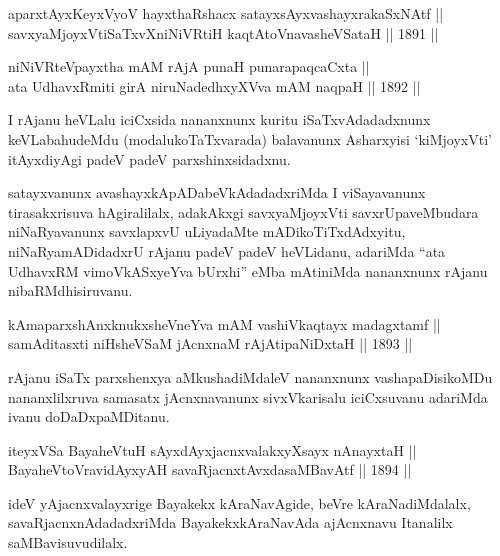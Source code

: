 \begin{shl}
aparxtAyxKeyxVyoV hayxthaRshacx satayxsAyxvashayxrakaSxNAtf || \\
savxyaMjoyxVtiSaTxvXniNiVRtiH kaqtA\s toV\s navasheVSataH \hfill || 1891 ||
  
\end{shl}

\begin{shl}
niNiVRteV\s payxtha mAM rAjA punaH punarapaqcaCxta || \\
ata UdhavxRmiti girA niruNadedhxyXVva mAM naqpaH \hfill || 1892 ||
  
\end{shl}

\begin{artha}
I rAjanu heVLalu iciCxsida nananxnunx kuritu iSaTxvAdadadxnunx
keVLabahudeMdu (modalukoTaTxvarada) balavanunx Asharxyisi `kiMjoyxVti'
itAyxdiyAgi padeV padeV parxshinxsidadxnu.
\end{artha}

\begin{artha}
satayxvanunx avashayxkApADabeVkAdadadxriMda I viSayavanunx
tirasakxrisuva hAgiralilalx, adakAkxgi savxyaMjoyxVti
savxrUpaveMbudara niNaRyavanunx savxlapxvU uLiyadaMte
mADikoTiTxdAdxyitu, niNaRyamADidadxrU rAjanu padeV padeV heVLidanu,
adariMda ``ata UdhavxRM vimoVkASxyeYva bUrxhi'' eMba mAtiniMda nananxnunx rAjanu nibaRMdhisiruvanu.
\end{artha}

\begin{shl}
kAmaparxshAnxknukxsheVneYva mAM vashiVkaqtayx madagxtamf || \\
samAditasxti niHsheVSaM jAcnxnaM rAjA\s tipaNiDxtaH \hfill || 1893 ||
  
\end{shl}

\begin{artha}
rAjanu iSaTx parxshenxya aMkushadiMdaleV nananxnunx vashapaDisikoMDu
nananxlilxruva samasatx jAcnxnavanunx sivxVkarisalu iciCxsuvanu
adariMda ivanu doDaDxpaMDitanu.
\end{artha}

\begin{shl}
iteyxVSa BayaheVtuH sAyxdAyxjacnxvalakxyXsayx nAnayxtaH || \\
BayaheVtoVravidAyxyAH savaRjacnxtAvxdasaMBavAtf \hfill || 1894 ||
  
\end{shl}

\begin{artha}
ideV yAjacnxvalayxrige Bayakekx kAraNavAgide, beVre kAraNadiMdalalx,
savaRjacnxnAdadadxriMda BayakekxkAraNavAda ajAcnxnavu Itanalilx
saMBavisuvudilalx.
\end{artha}

